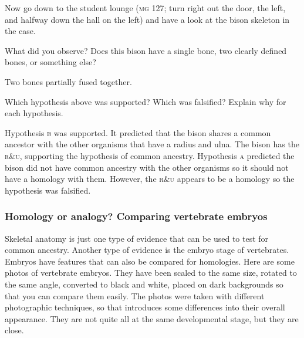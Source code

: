 \documentclass[12pt, hidelinks]{exam}
\newcommand*\AnswerBox[2]{%
    \parbox[t][#1]{0.92\textwidth}{%
    \begin{solution}#2\end{solution}}
    \vspace{\stretch{1}}
}
\begin{document}
\begin{questions}
Now go down to the student lounge (\textsc{mg} 127; turn right out the door, 
the left, and halfway down the hall on the left) and have a look at the bison
skeleton in the case. 


\question
What did you observe? Does this bison have a single bone, two clearly defined bones, or something else?

\AnswerBox{5\baselineskip}{Two bones partially fused together.}

\question
Which hypothesis above was supported? Which was falsified? Explain why for each hypothesis.

\AnswerBox{4\baselineskip}{Hypothesis \textsc{b} was supported. It predicted that the bison shares a common ancestor with the other organisms that have a radius and ulna. The bison has the \textsc{r\&u}, supporting the hypothesis of common ancestry. Hypothesis \textsc{a} predicted the bison did not have common ancestry with the other organisms so it should not have a homology with them. However, the \textsc{r\&u} appears to be a homology so the hypothesis was falsified.}

\newpage

\subsubsection*{Homology or analogy? Comparing vertebrate embryos}

Skeletal anatomy is just one type of evidence that can
be used to test for common ancestry. Another type of evidence is the 
embryo stage of vertebrates. Embryos have features that can
also be compared for homologies.
Here are some photos of vertebrate embryos. They have been scaled to
the same size, rotated to the same angle, converted to 
black and white, placed on dark backgrounds so that you can compare 
them easily. The photos were taken with different
photographic techniques, so that introduces some differences into their
overall appearance. They are not quite all at the same developmental
stage, but they are close.


\end{questions}
\end{document}
